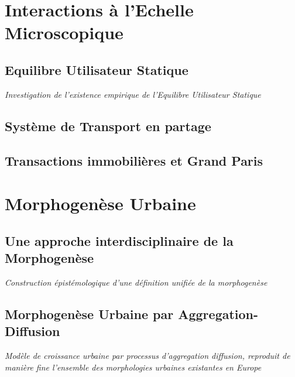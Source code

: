 \section{Interactions à l'Echelle Microscopique}

\subsection{Equilibre Utilisateur Statique}

\textit{Investigation de l'existence empirique de l'Equilibre Utilisateur Statique~\cite{raimbault2016investigating}}


\subsection{Système de Transport en partage}




\subsection{Transactions immobilières et Grand Paris}



\section{Morphogenèse Urbaine}

\subsection{Une approche interdisciplinaire de la Morphogenèse}

\textit{Construction épistémologique d'une définition unifiée de la morphogenèse~\cite{antelope2016interdisciplinary}}


\subsection{Morphogenèse Urbaine par Aggregation-Diffusion}

\textit{Modèle de croissance urbaine par processus d'aggregation diffusion, reproduit de manière fine l'ensemble des morphologies urbaines existantes en Europe} 



